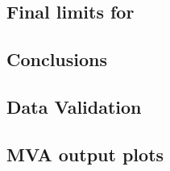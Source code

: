 \documentclass{cmspaper}
\begin{document}
     \subsection{Final limits for \lpintlumi}
    \label{app:lp_limits}
     

     \subsection{Conclusions}
     

    \subsection{Data Validation}
    \label{app:lp_postEPSdist}
    

    \subsection{MVA output plots}
    \label{app:lp_mvaplots}
    
    
    
    
    

  \clearpage
\end{document}
